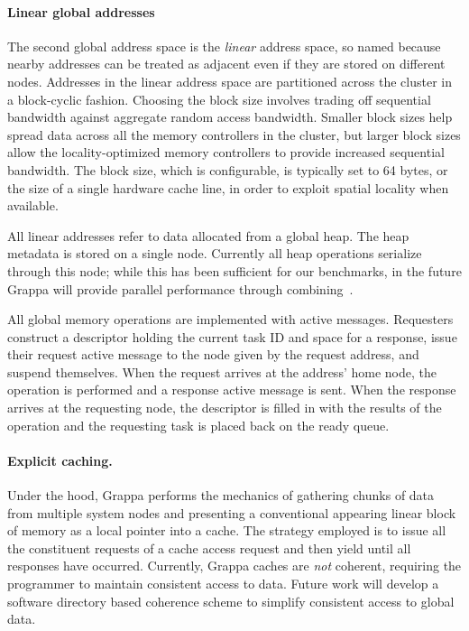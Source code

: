 \paragraph{Linear global addresses} The second global address space is
the {\em linear} address space, so named because nearby addresses can be
treated as adjacent even if they are stored on different nodes.
Addresses in the linear address space are partitioned across the cluster
in a block-cyclic fashion. Choosing the block size involves trading off
sequential bandwidth against aggregate random access bandwidth. Smaller
block sizes help spread data across all the memory controllers in the
cluster, but larger block sizes allow the locality-optimized memory
controllers to provide increased sequential bandwidth. The block size,
which is configurable, is typically set to 64 bytes, or the size of a
single hardware cache line, in order to exploit spatial locality when
available. 

All linear addresses refer to data allocated from a global heap. The
heap metadata is stored on a single node. Currently all heap operations
serialize through this node; while this has been sufficient for our
benchmarks, in the future Grappa will provide parallel performance
through combining~\cite{MAMA,flatcombining}.


All global memory operations are implemented with active messages.
Requesters construct a descriptor holding the current task ID and space
for a response, issue their request active message to the node given by
the request address, and suspend themselves. When the request arrives at
the address' home node, the operation is performed and a response active
message is sent. When the response arrives at the requesting node, the
descriptor is filled in with the results of the operation and the
requesting task is placed back on the ready queue.

\paragraph{Explicit caching.} Under the hood, Grappa performs the
mechanics of gathering chunks of data from multiple system nodes and
presenting a conventional appearing linear block of memory as a local
pointer into a cache. The strategy employed is to issue all the
constituent requests of a cache access request and then yield until all
responses have occurred.  Currently, Grappa caches are \emph{not}
coherent, requiring the programmer to maintain consistent access to
data.  Future work will develop a software directory based coherence
scheme to simplify consistent access to global data.

